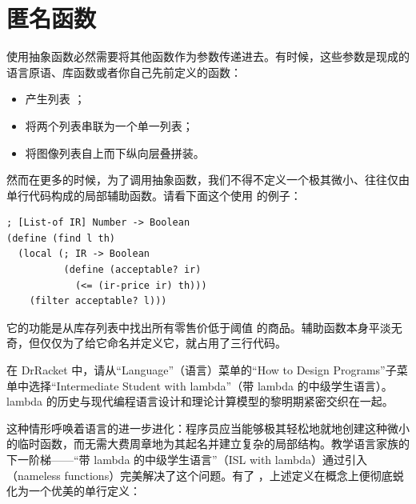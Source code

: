 
\chapter{匿名函数}
\label{sec:ch17_nameless_functions}

使用抽象函数必然需要将其他函数作为参数传递进去。有时候，这些参数是现成的语言原语、库函数或者你自己先前定义的函数：
\begin{itemize}
  \item {} 产生列表 ；
  \item {} 将两个列表串联为一个单一列表；
  \item {} 将图像列表自上而下纵向层叠拼装。
\end{itemize}

然而在更多的时候，为了调用抽象函数，我们不得不定义一个极其微小、往往仅由单行代码构成的局部辅助函数。请看下面这个使用  的例子：

\begin{lstlisting}[language=BSL]
; [List-of IR] Number -> Boolean
(define (find l th)
  (local (; IR -> Boolean
          (define (acceptable? ir)
            (<= (ir-price ir) th)))
    (filter acceptable? l)))
\end{lstlisting}

它的功能是从库存列表中找出所有零售价低于阈值  的商品。辅助函数本身平淡无奇，但仅仅为了给它命名并定义它，就占用了三行代码。

\begin{notebox}
在 DrRacket 中，请从“Language”（语言）菜单的“How to Design Programs”子菜单中选择“Intermediate Student with lambda”（带 lambda 的中级学生语言）。lambda 的历史与现代编程语言设计和理论计算模型的黎明期紧密交织在一起。
\end{notebox}

这种情形呼唤着语言的进一步进化：程序员应当能够极其轻松地就地创建这种微小的临时函数，而无需大费周章地为其起名并建立复杂的局部结构。教学语言家族的下一阶梯——“带 lambda 的中级学生语言”（ISL with lambda）通过引入（nameless functions）完美解决了这个问题。有了 ，上述定义在概念上便彻底蜕化为一个优美的单行定义：

